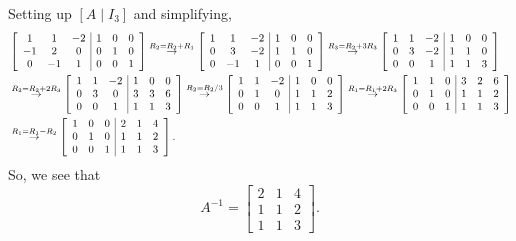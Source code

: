 \begin{answer}
	Setting up $[A \mid I_3]$ and simplifying,
	\begin{align*}
		&\left[\begin{array}{ccc | ccc}
			1 & 1 & -2 & 1 & 0 & 0 \\
			-1 & 2 & 0 & 0 & 1 & 0 \\
			0 & -1 & 1 & 0 & 0 & 1
		\end{array}\right]
		\stackrel{R_2 = R_2 + R_1}{\to}
		\left[\begin{array}{ccc | ccc}
			1 & 1 & -2 & 1 & 0 & 0 \\
			0 & 3 & -2 & 1 & 1 & 0 \\
			0 & -1 & 1 & 0 & 0 & 1
		\end{array}\right]
		\stackrel{R_3 = R_2 + 3R_3}{\to}
		\left[\begin{array}{ccc | ccc}
			1 & 1 & -2 & 1 & 0 & 0 \\
			0 & 3 & -2 & 1 & 1 & 0 \\
			0 & 0 & 1  & 1 & 1 & 3
		\end{array}\right] \\
		&\stackrel{R_2 = R_2 + 2R_3}{\to}
		\left[\begin{array}{ccc | ccc}
			1 & 1 & -2 & 1 & 0 & 0 \\
			0 & 3 & 0  & 3 & 3 & 6 \\
			0 & 0 & 1  & 1 & 1 & 3
		\end{array}\right]
		\stackrel{R_2 = R_2 / 3}{\to}
		\left[\begin{array}{ccc | ccc}
			1 & 1 & -2 & 1 & 0 & 0 \\
			0 & 1 & 0  & 1 & 1 & 2 \\
			0 & 0 & 1  & 1 & 1 & 3
		\end{array}\right] 
		\stackrel{R_1 = R_1 + 2R_3}{\to}
		\left[\begin{array}{ccc | ccc}
			1 & 1 & 0 & 3 & 2 & 6 \\
			0 & 1 & 0 & 1 & 1 & 2 \\
			0 & 0 & 1 & 1 & 1 & 3
		\end{array}\right] \\
		&\stackrel{R_1 = R_1 - R_2}{\to}
		\left[\begin{array}{ccc | ccc}
			1 & 0 & 0 & 2 & 1 & 4 \\
			0 & 1 & 0 & 1 & 1 & 2 \\
			0 & 0 & 1 & 1 & 1 & 3
		\end{array}\right].
	\end{align*}
	So, we see that
	\begin{equation*}
		A^{-1} = \begin{bmatrix}
			2 & 1 & 4 \\
			1 & 1 & 2 \\
			1 & 1 & 3
		\end{bmatrix}.
	\end{equation*}
\end{answer}

